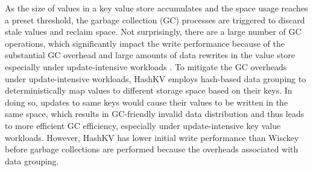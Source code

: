 \documentclass[sigconf]{acmart}
\begin{document}
As the size of values in a key value store accumulates and the space usage reaches a preset threshold,  the garbage collection (GC) processes are triggered to discard stale values and reclaim space. Not surprisingly, there are a large number of GC operations, which significantly impact the write performance because of the substantial GC overhead \cite{Wisckey} and large amounts of data rewrites in the value store especially under update-intensive workloads \cite{HashKV}. To mitigate the GC overheads under update-intensive workloads, HashKV employs hash-based data grouping to deterministically map values to different storage space based on their keys. In doing so, updates to same keys would cause their values to be written in the same space, which results in GC-friendly invalid data distribution and thus leads to more efficient GC efficiency, especially under update-intensive key value workloads. However, HashKV has lower initial write performance than Wisckey before garbage collections are performed because the overheads associated with data grouping.

\end{document}
